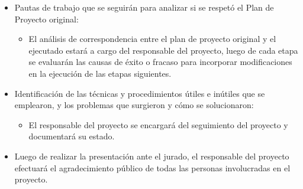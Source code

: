 \documentclass[
11pt%
]{charter}
\begin{document}
\begin{itemize}
	\item Pautas de trabajo que se seguirán para analizar si se respetó el Plan de Proyecto original:\\
	\begin{itemize}
	 \item El análisis de correspondencia entre el plan de proyecto original y el ejecutado estará a cargo del responsable del proyecto, luego de cada etapa se evaluarán las causas de éxito o fracaso para incorporar modificaciones en la ejecución de las etapas siguientes.
	 \end{itemize}
	\item Identificación de las técnicas y procedimientos útiles e inútiles que se emplearon, y los problemas que surgieron y cómo se solucionaron:
	\begin{itemize}
	 \item El responsable del proyecto se encargará del seguimiento del proyecto y documentará su estado.
	 \end{itemize}
	\item Luego de realizar la presentación ante el jurado, el responsable del proyecto efectuará el agradecimiento público de todas las personas involucradas en el proyecto.
\end{itemize}
\end{document}
